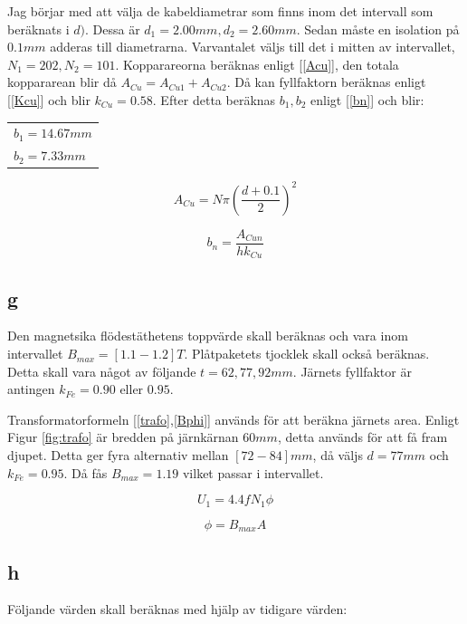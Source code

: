 \documentclass{article}
\begin{document}
Jag börjar med att välja de kabeldiametrar som finns inom det intervall som beräknats i $d)$.
Dessa är $d_1=2.00 mm,d_2=2.60 mm$.
Sedan måste en isolation på $0.1 mm$ adderas till diametrarna.
Varvantalet väljs till det i mitten av intervallet, $N_1=202, N_2=101$.
Kopparareorna beräknas enligt [\ref{Acu}], den totala koppararean blir då $A_{Cu}=A_{Cu1}+A_{Cu2}$.
Då kan fyllfaktorn beräknas enligt [\ref{Kcu}] och blir $k_{Cu}= 0.58$.
Efter detta beräknas $b_1,b_2$ enligt [\ref{bn}] och blir:
\begin{tabular}{|l}
  $b_1=14.67 mm$\\
  $b_2=7.33 mm$\\
\end{tabular}


\begin{equation}
  A_{Cu}=N\pi(\frac{d+0.1}{2})^2
 \label{Acu}
 \end{equation}

\begin{equation}
  b_n=\frac{A_{Cun}}{h k_{Cu}}
  \label{bn}
\end{equation}

\subsection{g}
Den magnetsika flödestäthetens toppvärde skall beräknas och vara inom intervallet $B_{max}=[1.1 - 1.2] T$.
Plåtpaketets tjocklek skall också beräknas.
Detta skall vara något av följande $t = 62, 77, 92 mm$.
Järnets fyllfaktor är antingen $k_{Fe}=0.90$ eller $0.95$.

Transformatorformeln [\ref{trafo},\ref{Bphi}] används för att beräkna järnets area.
Enligt Figur \ref{fig:trafo} är bredden på järnkärnan $60 mm$, detta används för att få fram djupet.
Detta ger fyra alternativ mellan $[72 - 84] mm$, då väljs $d=77 mm$ och $k_{Fe}=0.95$.
Då fås $B_{max}=1.19$ vilket passar i intervallet.


\begin{equation}
  U_1=4.4 f N_1 \phi
  \label{trafo}
\end{equation}

\begin{equation}
  \phi=B_{max} A
  \label{Bphi}
\end{equation}

\subsection{h}
Följande värden skall beräknas med hjälp av tidigare värden:
\end{document}
